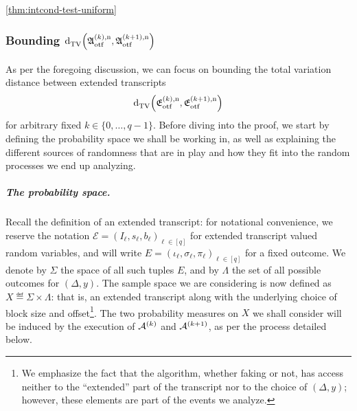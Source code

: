 \begin{proofof}{\cref{thm:intcond-test-uniform}}
\subsubsection{Bounding ${\operatorname{d}_{\textrm{TV}}^{}\!\left({ \mathfrak{A}^{(k), \rm n}_{\rm otf} ,  \mathfrak{A}^{(k+1), \rm n}_{\rm otf} }\right)}$}\label{sssec:unif-lb:intcond:adapt:proof}

As per the foregoing discussion, we can focus on bounding the total variation distance between extended transcripts
\[
{\operatorname{d}_{\textrm{TV}}^{}\!\left({ \mathfrak{E}^{(k), \rm n}_{\rm otf} ,  \mathfrak{E}^{(k+1), \rm n}_{\rm otf} }\right)}
\]
for arbitrary fixed $k\in\{0,\dots, q-1\}$.
Before diving into the proof, we start by defining the probability space we shall be working in, as well as explaining the different sources of randomness
that are in play and how they fit into the random processes we end up analyzing.

\subparagraph{The probability space.} Recall the definition of an extended transcript: for notational convenience, we reserve the notation $\mathcal{E}=(I_\ell, s_\ell, b_\ell)_{\ell \in [q]}$ for extended transcript valued random variables, and will write $E=(\iota_\ell, \sigma_\ell, \pi_\ell)_{\ell \in [q]}$ for a fixed outcome. We denote by $\Sigma$ the space of all such tuples $E$, and by $\Lambda$ the set of all possible outcomes for $(\Delta,y)$. The sample space we are considering is now defined as $X\eqdef \Sigma\times\Lambda$: that is, an extended transcript along with the underlying choice of block size and offset\footnote{We emphasize the fact that the algorithm, whether faking or not, has access neither to the ``extended'' part of the transcript nor to the choice of $(\Delta,y)$; however, these elements are part of the events we analyze.}. The two probability measures on $X$ we shall consider will be induced by the execution of $\mathcal{A}^{(k)}$ and $\mathcal{A}^{(k+1)}$, as per the process detailed below.\medskip


\end{proofof}

